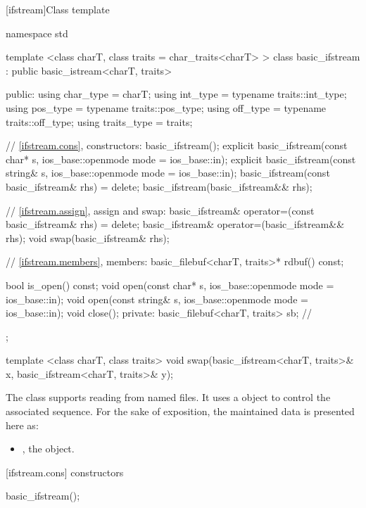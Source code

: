 [ifstream]{Class template }

%
\begin{codeblock}
namespace std {
  template <class charT, class traits = char_traits<charT> >
  class basic_ifstream
    : public basic_istream<charT, traits> {
  public:
    using char_type   = charT;
    using int_type    = typename traits::int_type;
    using pos_type    = typename traits::pos_type;
    using off_type    = typename traits::off_type;
    using traits_type = traits;

    // \ref{ifstream.cons}, constructors:
    basic_ifstream();
    explicit basic_ifstream(const char* s,
                            ios_base::openmode mode = ios_base::in);
    explicit basic_ifstream(const string& s,
                            ios_base::openmode mode = ios_base::in);
    basic_ifstream(const basic_ifstream& rhs) = delete;
    basic_ifstream(basic_ifstream&& rhs);

    // \ref{ifstream.assign}, assign and swap:
    basic_ifstream& operator=(const basic_ifstream& rhs) = delete;
    basic_ifstream& operator=(basic_ifstream&& rhs);
    void swap(basic_ifstream& rhs);

    // \ref{ifstream.members}, members:
    basic_filebuf<charT, traits>* rdbuf() const;

    bool is_open() const;
    void open(const char* s, ios_base::openmode mode = ios_base::in);
    void open(const string& s, ios_base::openmode mode = ios_base::in);
    void close();
  private:
    basic_filebuf<charT, traits> sb; // \expos
  };

  template <class charT, class traits>
    void swap(basic_ifstream<charT, traits>& x,
              basic_ifstream<charT, traits>& y);
}
\end{codeblock}

\pnum
The class
supports reading from named files.
It uses a
object to control the associated
sequence.
For the sake of exposition, the maintained data is presented here as:

\begin{itemize}
\item
{}, the  object.
\end{itemize}

[ifstream.cons]{ constructors}

%
\begin{itemdecl}
basic_ifstream();
\end{itemdecl}

